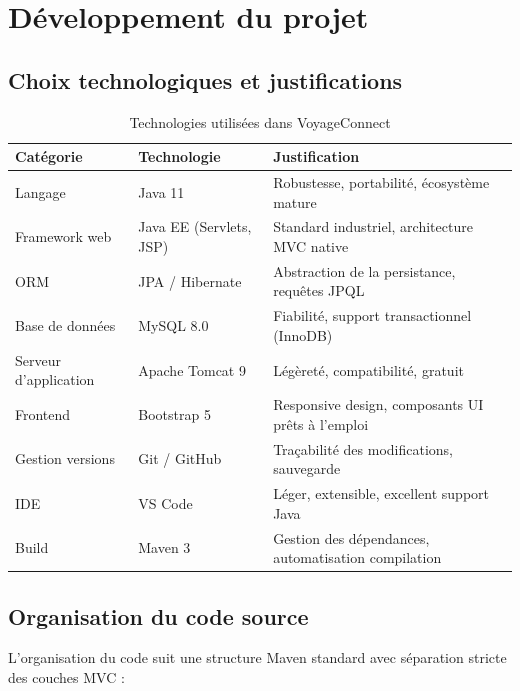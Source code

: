 \documentclass[12pt,a4paper]{report}
\begin{document}



\section{Développement du projet}

\subsection{Choix technologiques et justifications}

\begin{table}[H]
\centering
\caption{Technologies utilisées dans VoyageConnect}
\label{tab:technologies}
\begin{tabular}{|l|l|p{6cm}|}
\hline
\textbf{Catégorie} & \textbf{Technologie} & \textbf{Justification} \\
\hline
Langage & Java 11 & Robustesse, portabilité, écosystème mature \\
\hline
Framework web & Java EE (Servlets, JSP) & Standard industriel, architecture MVC native \\
\hline
ORM & JPA / Hibernate & Abstraction de la persistance, requêtes JPQL \\
\hline
Base de données & MySQL 8.0 & Fiabilité, support transactionnel (InnoDB) \\
\hline
Serveur d'application & Apache Tomcat 9 & Légèreté, compatibilité, gratuit \\
\hline
Frontend & Bootstrap 5 & Responsive design, composants UI prêts à l'emploi \\
\hline
Gestion versions & Git / GitHub & Traçabilité des modifications, sauvegarde \\
\hline
IDE & VS Code & Léger, extensible, excellent support Java \\
\hline
Build & Maven 3 & Gestion des dépendances, automatisation compilation \\
\hline
\end{tabular}
\end{table}

\subsection{Organisation du code source}

L'organisation du code suit une structure Maven standard avec séparation stricte des couches MVC :
\end{document}
